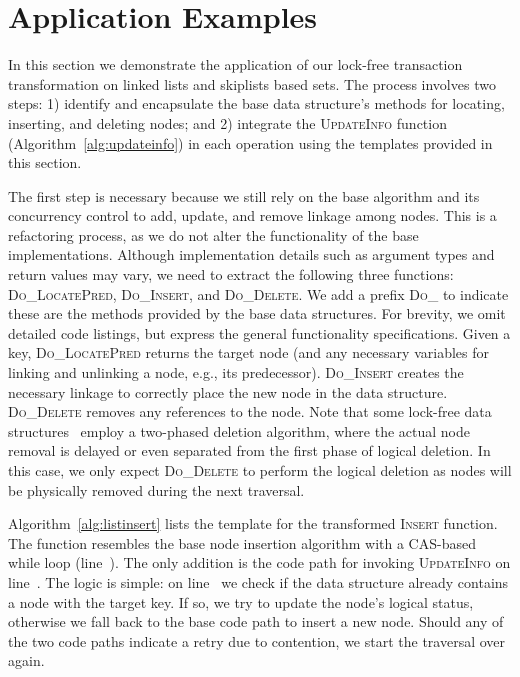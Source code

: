 \documentclass{sig-alternate-05-2015}
\begin{document}
\section{Application Examples}
\label{sec:application}
In this section we demonstrate the application of our lock-free transaction transformation on linked lists and skiplists based sets. 
The process involves two steps: 1) identify and encapsulate the base data structure's methods for locating, inserting, and deleting nodes; and 2) integrate the \textsc{UpdateInfo} function (Algorithm~\ref{alg:updateinfo}) in each operation using the templates provided in this section.

The first step is necessary because we still rely on the base algorithm and its concurrency control to add, update, and remove linkage among nodes.
This is a refactoring process, as we do not alter the functionality of the base implementations. 
Although implementation details such as argument types and return values may vary, we need to extract the following three functions: \textsc{Do\_LocatePred}, \textsc{Do\_Insert}, and \textsc{Do\_Delete}.
We add a prefix \textsc{Do\_} to indicate these are the methods provided by the base data structures.
For brevity, we omit detailed code listings, but express the general functionality specifications.
Given a key, \textsc{Do\_LocatePred} returns the target node (and any necessary variables for linking and unlinking a node, e.g., its predecessor).
\textsc{Do\_Insert} creates the necessary linkage to correctly place the new node in the data structure.
\textsc{Do\_Delete} removes any references to the node.
Note that some lock-free data structures~\cite{harris2001pragmatic,fraser2004practical} employ a two-phased deletion algorithm, where the actual node removal is delayed or even separated from the first phase of logical deletion.
In this case, we only expect \textsc{Do\_Delete} to perform the logical deletion as nodes will be physically removed during the next traversal.

Algorithm~\ref{alg:listinsert} lists the template for the transformed \textsc{Insert} function.
The function resembles the base node insertion algorithm with a CAS-based while loop (line~).
The only addition is the code path for invoking \textsc{UpdateInfo} on line~.
The logic is simple: on line~ we check if the data structure already contains a node with the target key.
If so, we try to update the node's logical status, otherwise we fall back to the base code path to insert a new node. 
Should any of the two code paths indicate a retry due to contention, we start the traversal over again.
\end{document}
